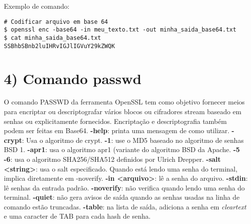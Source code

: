 \documentclass[a4paper,11pt]{article}
\theoremstyle{mytheor}
\begin{document}
\noindent Exemplo de comando:
\begin{lstlisting}
# Codificar arquivo em base 64
$ openssl enc -base64 -in meu_texto.txt -out minha_saida_base64.txt
$ cat minha_saida_base64.txt
SSBhbSBnb2luIHRvIGJlIGVuY29kZWQK
\end{lstlisting}

\section*{4) Comando passwd}
O comando PASSWD da ferramenta OpenSSL tem como objetivo fornecer meios para encriptar ou descriptografar vários blocos ou cifradores stream baseado em senhas ou explicitamente fornecidos. Encriptação e descriptografia também podem ser feitas em Base64.
\newline\newline
\noindent \textbf{-help}: printa uma mensagem de como utilizar.
\newline\newline
\noindent \textbf{-crypt}: Usa o algoritmo de crypt.
\newline\newline
\noindent \textbf{-1}: use o MD5 baseado no algoritmo de senhas BSD 1.
\newline\newline
\noindent \textbf{-apr1}: usa o algoritmo apr1 (variante do algoritmo BSD da Apache.
\newline\newline
\noindent \textbf{-5}
\textbf{-6}: usa o algoritmo SHA256/SHA512 definidos por Ulrich Drepper. 
\newline\newline
\noindent \textbf{-salt <string>}: usa o salt especificado. Quando está lendo uma senha do terminal, implica diretamente em -noverify.
\newline\newline
\noindent \textbf{-in <arquivo>}: lê a senha do arquivo.
\newline\newline
\noindent \textbf{-stdin}: lê senhas da entrada padrão.
\newline\newline
\noindent \textbf{-noverify}: não verifica quando lendo uma senha do terminal.
\newline\newline
\noindent \textbf{-quiet}: não gera avisos de saída quando as senhas usadas na linha de comando estão truncadas.
\newline\newline
\noindent \textbf{-table}: na lista de saída, adiciona a senha em \textit{cleartext} e uma caracter de TAB para cada hash de senha.
\newline\newline
\end{document}
